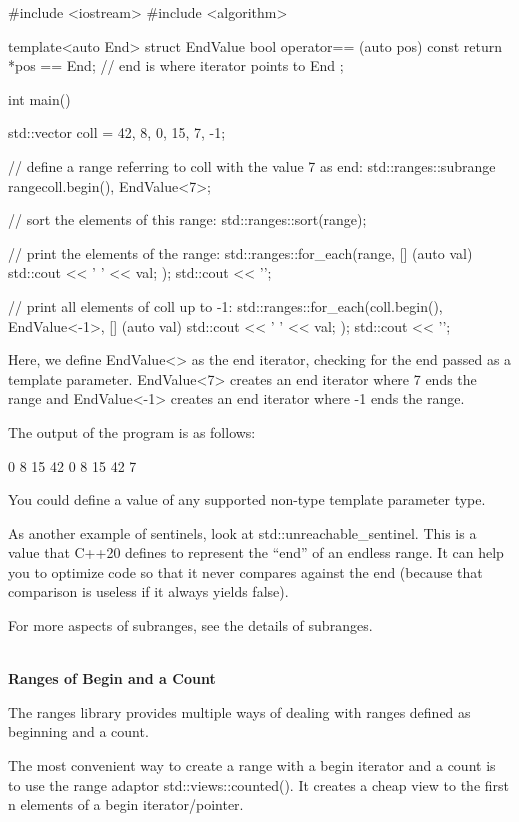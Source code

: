 \begin{cpp}
#include <iostream>
#include <algorithm>

template<auto End>
struct EndValue {
	bool operator== (auto pos) const {
		return *pos == End; // end is where iterator points to End
	}
};

int main()
{
	std::vector coll = {42, 8, 0, 15, 7, -1};
	
	// define a range referring to coll with the value 7 as end:
	std::ranges::subrange range{coll.begin(), EndValue<7>{}};
	
	// sort the elements of this range:
	std::ranges::sort(range);
	
	// print the elements of the range:
	std::ranges::for_each(range,
						[] (auto val) {
							std::cout << ' ' << val;
						});
	std::cout << '\n';
	
	// print all elements of coll up to -1:
	std::ranges::for_each(coll.begin(), EndValue<-1>{},
							[] (auto val) {
								std::cout << ' ' << val;
							});
	std::cout << '\n';
}
\end{cpp}

Here, we define EndValue<> as the end iterator, checking for the end passed as a template parameter. EndValue<7>{} creates an end iterator where 7 ends the range and EndValue<-1>{} creates an end iterator where -1 ends the range.

The output of the program is as follows:

\begin{shell}
0 8 15 42
0 8 15 42 7
\end{shell}

You could define a value of any supported non-type template parameter type.

As another example of sentinels, look at std::unreachable\_sentinel. This is a value that C++20 defines to represent the “end” of an endless range. It can help you to optimize code so that it never compares against the end (because that comparison is useless if it always yields false).

For more aspects of subranges, see the details of subranges.

\noindent
\hspace*{\fill} \\ %
\textbf{Ranges of Begin and a Count}

The ranges library provides multiple ways of dealing with ranges defined as beginning and a count.

The most convenient way to create a range with a begin iterator and a count is to use the range adaptor std::views::counted(). It creates a cheap view to the first n elements of a begin iterator/pointer.

